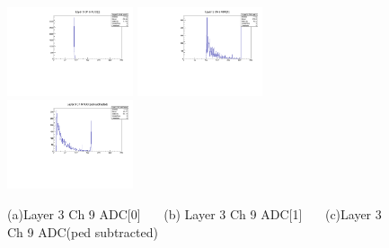 \documentclass[a4paper,11pt]{article}
\theoremstyle{mytheor}
\begin{document}
\clearpage 
\begin{figure}[H] 
\vspace*{-0.3cm} 
\includegraphics[width=0.33\textwidth,scale=0.5,trim=0 0 0 0,clip]{plotsdir/file0_muons-Layer3_Ch9_adc0-1.pdf} 
\includegraphics[width=0.33\textwidth,scale=0.5,trim=0 0 0 0,clip]{plotsdir/file0_muons-Layer3_Ch9_adc1-1.pdf} 
\includegraphics[width=0.33\textwidth,scale=0.5,trim=0 0 0 0,clip]{plotsdir/file0_muons-Layer3_Ch9_adcPedsub-1.pdf} 
\caption{(a)Layer 3 Ch 9 ADC[0] ~~~(b) Layer 3 Ch 9 ADC[1] ~~~(c)Layer 3 Ch 9 ADC(ped subtracted) } 
\end{figure} 
\newpage 
\end{document}
